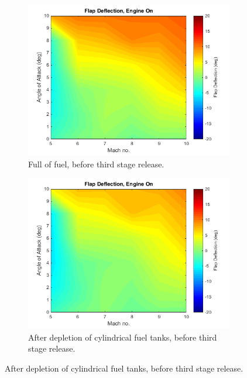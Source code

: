 		\begin{figure}
			\begin{subfigure}{.5\textwidth}
				\centering
				\includegraphics[width=0.99\linewidth]{figures/3_vehicle_design/FlapEngineCG1}
				\caption{Full of fuel, before third stage release.}
			\end{subfigure}
			\begin{subfigure}{.5\textwidth}
				\centering
				\includegraphics[width=0.99\linewidth]{figures/3_vehicle_design/FlapEngineCG2}
				\caption{After depletion of cylindrical fuel tanks, before third stage release.}
				

\end{subfigure}
\end{figure}
